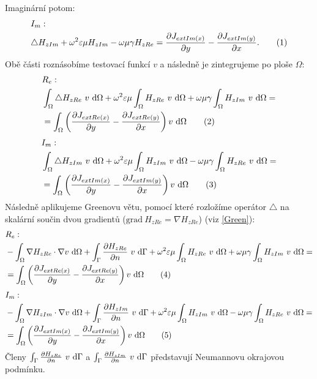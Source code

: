 \documentclass[12pt,a4paper,oneside]{article}
\numberwithin{equation}{section} %
\numberwithin{figure}{section} %
\numberwithin{table}{section} %
\newcommand{\grad}{\mathrm{grad}\ }
\newcommand\numberthis{\addtocounter{equation}{1}\tag{\theequation}}
\begin{document}
Imaginární potom:
\begin{align*}
&I_{m}:
\\
&\triangle H _{zIm} + \omega ^2 \varepsilon \mu H _{zIm} - \omega \mu \gamma H _{zRe} = \frac{\partial J _{extIm(x)}}{\partial y} - \frac{\partial J _{extIm(y)}}{\partial x} .
\numberthis
\end{align*}
Obě části roznásobíme testovací funkcí $v$ a následně je  zintegrujeme po ploše $\Omega$:
\begin{align*}
&R_e:
\\
&\int _{\Omega} \triangle H _{zRe} ~ v ~ \ud \Omega + \omega ^2 \varepsilon \mu \int _{\Omega} H _{zRe} ~ v ~ \ud \Omega + \omega \mu \gamma \int _{\Omega} H _{zIm} ~ v ~ \ud \Omega = 
\\
&= \int _{\Omega} \left( \frac{\partial J _{extRe(x)}}{\partial y} - \frac{\partial J _{extRe(y)}}{\partial x} \right) v ~ \ud \Omega
\numberthis
\end{align*}
\begin{align*}
&I_m:
\\
&\int _{\Omega} \triangle H _{zIm} ~ v ~ \ud \Omega + \omega ^2 \varepsilon \mu \int _{\Omega} H _{zIm} ~ v ~ \ud \Omega - \omega \mu \gamma \int _{\Omega} H _{zRe} ~ v ~ \ud \Omega = 
\\
&= \int _{\Omega} \left(\frac{\partial J _{extIm(x)}}{\partial y} - \frac{\partial J _{extIm(y)}}{\partial x} \right) v ~ \ud \Omega
\numberthis
\end{align*}
Následně aplikujeme Greenovu větu, pomocí které rozložíme operátor $\triangle$ na skalární součin dvou gradientů ($\grad H _{zRe} = \nabla H _{zRe}$) (viz \ref{Green}):
\begin{align*}
&R_e:
\\
&- \int _{\Omega} \nabla H _{zRe} \cdot \nabla v ~ \ud \Omega + \int _{\Gamma} \frac{\partial H _{zRe}}{\partial n} ~ v ~ \ud \Gamma + \omega ^2 \varepsilon \mu \int _{\Omega} H _{zRe} ~ v ~ \ud \Omega + \omega \mu \gamma \int _{\Omega} H _{zIm} ~ v ~ \ud \Omega =
\\
&= \int _{\Omega} \left( \frac{\partial J _{extRe(x)}}{\partial y} - \frac{\partial J _{extRe(y)}}{\partial x} \right) v ~ \ud \Omega
\numberthis
\end{align*}
\begin{align*}
&I_m:
\\
&- \int _{\Omega} \nabla H _{zIm} \cdot \nabla v ~ \ud \Omega + \int _{\Gamma} \frac{\partial H _{zIm}}{\partial n} ~ v ~ \ud \Gamma + \omega ^2 \varepsilon \mu \int _{\Omega} H _{zIm} ~ v ~ \ud \Omega - \omega \mu \gamma \int _{\Omega} H _{zRe} ~ v ~ \ud \Omega = 
\\
&= \int _{\Omega} \left( \frac{\partial J _{extIm(x)}}{\partial y} - \frac{\partial J _{extIm(y)}}{\partial x} \right) v ~ \ud \Omega
\numberthis
\end{align*}
Členy $\int _{\Gamma} \frac{\partial H _{zRe}}{\partial n} ~ v ~ \mathrm{d} \Gamma$ a $\int _{\Gamma} \frac{\partial H _{zIm}}{\partial n} ~ v ~ \mathrm{d} \Gamma$ představují Neumannovu okrajovou podmínku.
\end{document}
